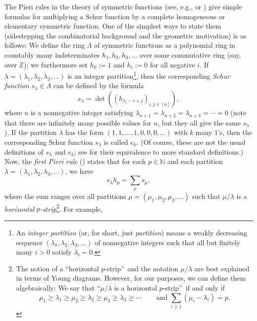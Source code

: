 \documentclass[numbers=enddot,12pt,final,onecolumn,notitlepage,english]{scrartcl}%
\theoremstyle{definition}
\let\sumnonlimits\sum
\renewcommand{\sum}{\sumnonlimits\limits}
\begin{document}
The Pieri rules in the theory of symmetric functions (see, e.g., \cite[Chapter
I, (5.16) and (5.17)]{Macdon95} or \cite[Theorem 7.15.7 and discussion before
Corollary 7.15.9]{Stanley-EC2}) give simple formulas for multiplying a Schur
function by a complete homogeneous or elementary symmetric function. One of
the simplest ways to state them (sidestepping the combinatorial background and
the geometric motivation) is as follows: We define the ring $\Lambda$ of
symmetric functions as a polynomial ring in countably many indeterminates
$h_{1},h_{2},h_{3},\ldots$ over some commutative ring (say, over $\mathbb{Z}%
$); we furthermore set $h_{0}:=1$ and $h_{i}:=0$ for all negative $i$. If
$\lambda=\left(  \lambda_{1},\lambda_{2},\lambda_{3},\ldots\right)  $ is an
integer partition\footnote{An \emph{integer partition} (or, for short, just
\emph{partition}) means a weakly decreasing sequence $\left(  \lambda
_{1},\lambda_{2},\lambda_{3},\ldots\right)  $ of nonnegative integers such
that all but finitely many $i>0$ satisfy $\lambda_{i}=0$.}, then the
corresponding \emph{Schur function} $s_{\lambda}\in\Lambda$ can be defined by
the formula%
\begin{equation}
s_{\lambda}=\det\left(  \left(  h_{\lambda_{i}-i+j}\right)  _{i,j\in\left[
n\right]  }\right)  , \label{eq.intro.slam=jt}%
\end{equation}
where $n$ is a nonnegative integer satisfying $\lambda_{n+1}=\lambda
_{n+2}=\lambda_{n+3}=\cdots=0$ (note that there are infinitely many possible
values for $n$, but they all give the same $s_{\lambda}$). If the partition
$\lambda$ has the form $\left(  1,1,\ldots,1,0,0,0,\ldots\right)  $ with $k$
many $1$'s, then the corresponding Schur function $s_{\lambda}$ is called
$e_{k}$. (Of course, these are not the usual definitions of $s_{\lambda}$ and
$e_{k}$; see \cite[Chapter I, (3.4) and (3.9)]{Macdon95} for their equivalence
to more standard definitions.) Now, the \emph{first Pieri rule} (\cite[Chapter
I, (5.16)]{Macdon95}) states that for each $p\in\mathbb{N}$ and each partition
$\lambda=\left(  \lambda_{1},\lambda_{2},\lambda_{3},\ldots\right)  $, we have%
\begin{equation}
s_{\lambda}h_{p}=\sum_{\mu}s_{\mu}, \label{eq.intro.pieri1}%
\end{equation}
where the sum ranges over all partitions $\mu=\left(  \mu_{1},\mu_{2},\mu
_{3},\ldots\right)  $ such that $\mu/\lambda$ is a \emph{horizontal }%
$p$\emph{-strip}\footnote{The notion of a \textquotedblleft horizontal
$p$-strip\textquotedblright\ and the notation $\mu/\lambda$ are best explained
in terms of Young diagrams. However, for our purposes, we can define them
algebraically: We say that \textquotedblleft$\mu/\lambda$ is a horizontal
$p$-strip\textquotedblright\ if and only if
\[
\mu_{1}\geq\lambda_{1}\geq\mu_{2}\geq\lambda_{2}\geq\mu_{3}\geq\lambda_{3}%
\geq\cdots\ \ \ \ \ \ \ \ \ \ \text{and }\sum_{i\geq1}\left(  \mu_{i}%
-\lambda_{i}\right)  =p.
\]
}. For example,%
\end{document}
